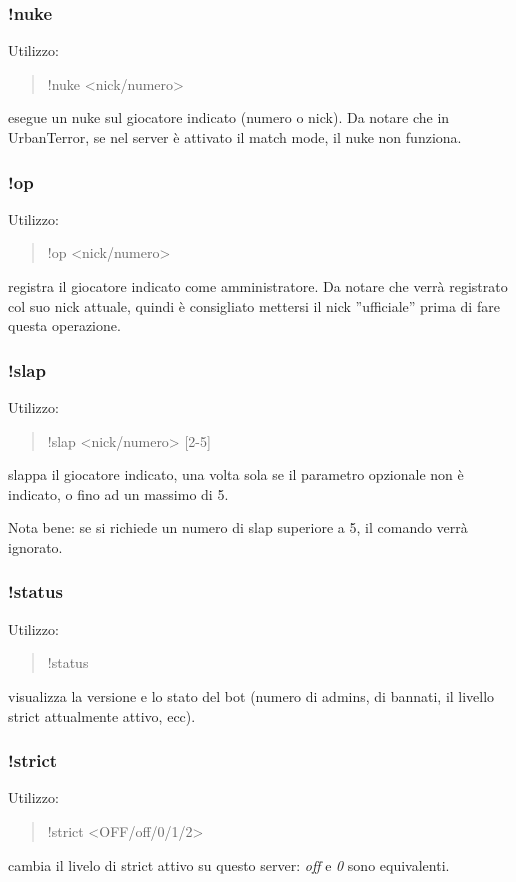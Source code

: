\documentclass[a4paper]{article}
\begin{document}
\subsubsection{!nuke}
Utilizzo:
\begin{quote}
!nuke \textless{}nick/numero\textgreater{}
\end{quote}
esegue un nuke sul giocatore indicato (numero o nick). Da notare che in UrbanTerror, se nel server \`e attivato il match mode, il nuke non funziona.

\subsubsection{!op}
Utilizzo:
\begin{quote}
!op \textless{}nick/numero\textgreater{}
\end{quote}
registra il giocatore indicato come amministratore. Da notare che verr\`a registrato col suo nick attuale, quindi \`e consigliato mettersi il nick ''ufficiale'' prima di fare questa operazione.

\subsubsection{!slap}
Utilizzo:
\begin{quote}
!slap \textless{}nick/numero\textgreater{} [2-5]
\end{quote}
slappa il giocatore indicato, una volta sola se il parametro opzionale non \`e indicato, o fino ad un massimo di 5.

Nota bene: se si richiede un numero di slap superiore a 5, il comando verr\`a ignorato.

\subsubsection{!status}
Utilizzo:
\begin{quote}
!status
\end{quote}
visualizza la versione e lo stato del bot (numero di admins, di bannati, il livello strict attualmente attivo, ecc).

\subsubsection{!strict}
Utilizzo:
\begin{quote}
!strict \textless{}OFF/off/0/1/2\textgreater{}
\end{quote}
cambia il livelo di strict attivo su questo server: \textit{off} e \textit{0} sono equivalenti.
\end{document}
